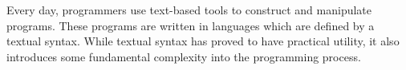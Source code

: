 







Every day, programmers use text-based tools to construct and manipulate programs.  
These programs are written in languages which are defined by a textual syntax. 
While textual syntax has proved to have practical utility, it also introduces some fundamental complexity into the programming process.

